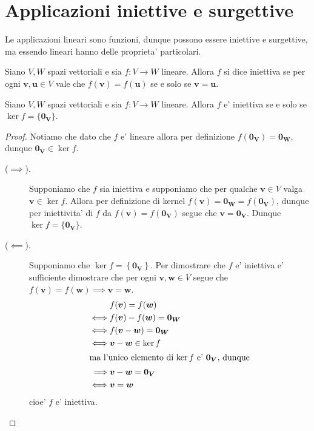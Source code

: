 \section{Applicazioni iniettive e surgettive}

Le applicazioni lineari sono funzioni, dunque possono essere iniettive e surgettive, ma essendo lineari hanno delle proprieta' particolari.

\begin{definition}
    Siano $V, W$ spazi vettoriali e sia $f : V \to W$ lineare. Allora $f$ si dice iniettiva se per ogni $\bm{v}, \bm{u} \in V$ vale che $f(\bm{v}) = f(\bm{u})$ se e solo se $\bm{v} = \bm{u}$.
\end{definition}

\begin{proposition}\label{ker_funzione_iniettiva}
    Siano $V, W$ spazi vettoriali e sia $f : V \to W$ lineare. Allora $f$ e' iniettiva se e solo se $\ker f = \{\bm{0_V}\}$. 
\end{proposition}
\begin{proof}
    Notiamo che dato che $f$ e' lineare allora per definizione $f(\bm{0_V}) = \bm{0_W}$, dunque $\bm{0_V} \in \ker f$.
    \begin{description}
        \item [($\implies$).] Supponiamo che $f$ sia iniettiva e supponiamo che per qualche $\bm{v} \in V$ valga $\bm{v} \in \ker f$. Allora per definizione di kernel $f(\bm{v}) = \bm{0_W} = f(\bm{0_V})$, dunque per iniettivita' di $f$ da $f(\bm{v}) = f(\bm{0_V})$ segue che $\bm v = \bm{0_V}$. Dunque $\ker f = \{\bm{0_V}\}$.
        \item [($\impliedby$).] Supponiamo che $\ker f = \left\{ \bm{0_V}\right\}$. Per dimostrare che $f$ e' iniettiva e' sufficiente dimostrare che per ogni $\bm{v}, \bm{w} \in V$ segue che $f(\bm{v}) = f(\bm{w}) \implies \bm{v} = \bm{w}$.
        \begin{alignat*}{1}
            &f(\bm{v}) = f(\bm{w}) \\
            \iff &f(\bm{v}) - f(\bm{w}) = \bm{0_W} \\
            \iff &f(\bm{v} - \bm{w}) = \bm{0_W} \\
            \iff &\bm{v} - \bm{w} \in \ker f \\
            \intertext{ma l'unico elemento di $\ker f$ e' $\bm{0_V}$, dunque}
            \implies &\bm{v} - \bm{w} = \bm{0_V}\\
            \iff &\bm{v} = \bm{w}
        \end{alignat*}
        cioe' $f$ e' iniettiva. \qedhere
    \end{description}
\end{proof}

